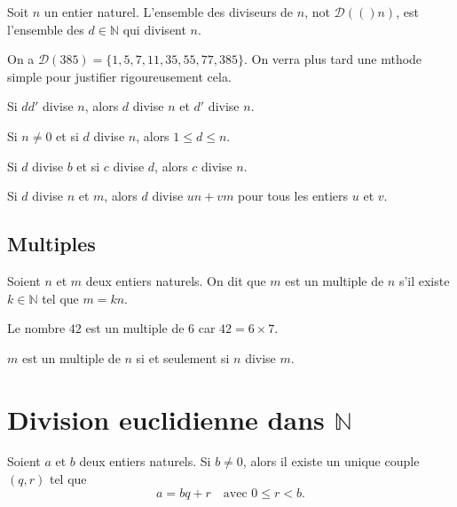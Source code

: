 \documentclass[a4paper,fleqn,openany]{trmbook}
\newcommand*{\N}{\mathbb{N}}
\newcommand*{\ensdiv}[1]{\mathcal{D}(#1)}
\newcommand*{\ens}[1]{\{#1\}}
\begin{document}
\begin{definition}
Soit $n$ un entier naturel. L'ensemble des diviseurs de $n$, not $\ensdiv(n)$, est l'ensemble des $d \in \N$ qui divisent $n$.
\end{definition}

\begin{exemple}
On a $\ensdiv{385} = \ens{1,5,7,11,35,55,77,385}$. On verra plus tard une mthode simple pour justifier rigoureusement cela.
\end{exemple}

\begin{proprietes}
\begin{sousproprietes}
    \item Si $dd'$ divise $n$, alors $d$ divise $n$ et $d'$ divise $n$.
    \item Si $n \neq 0$ et si $d$ divise $n$, alors $1 \leq d \leq n$.
    \item Si $d$ divise $b$ et si $c$ divise $d$, alors $c$ divise $n$.
    \item Si $d$ divise $n$ et $m$, alors $d$ divise $un+vm$ pour tous les entiers $u$ et $v$.
\end{sousproprietes}
\end{proprietes}

\subsection{Multiples}

\begin{definition}
Soient $n$ et $m$ deux entiers naturels. On dit que $m$ est un multiple de $n$ s'il existe $k \in \N$ tel que $m = kn$.
\end{definition}

\begin{exemple}
Le nombre $42$ est un multiple de $6$ car $42 = 6 \times 7$.
\end{exemple}

\begin{propriete}
$m$ est un multiple de $n$ si et seulement si $n$ divise $m$.
\end{propriete}

\section{Division euclidienne dans $\N$}

\begin{theoreme}
Soient $a$ et $b$ deux entiers naturels. Si $b \neq 0$, alors il existe un unique couple $(q,r)$ tel que
\[a = bq + r \quad \text{avec $0 \leq r < b$.}\]
\end{theoreme}
\end{document}
